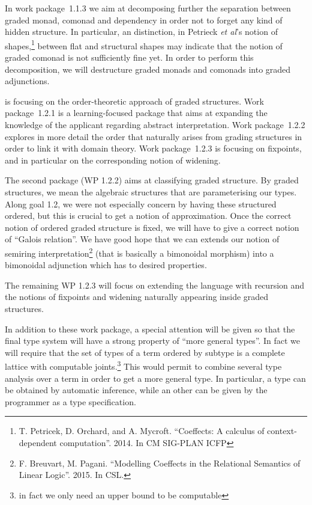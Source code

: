 \documentclass{article}[11pt]
\begin{document}
In work package~1.1.3 we aim at decomposing further the separation between graded monad, comonad and dependency in order not to forget any kind of hidden structure. In particular, an distinction, in Petrieck {\em et al}'s notion of shapes,\footnote{T. Petricek, D. Orchard, and A. Mycroft. ``Coeffects: A calculus of context-dependent computation''. 2014. In CM SIG-PLAN ICFP} between flat and structural shapes may indicate that the notion of graded comonad is not sufficiently fine yet. In order to perform this decomposition, we will destructure graded monads and comonads into graded adjunctions.

 is focusing on the order-theoretic approach of graded structures. Work package~1.2.1 is a learning-focused package that aims at expanding the knowledge of the applicant regarding abstract interpretation. %
Work package~1.2.2 explores in more detail the order that naturally arises from grading structures in order to link it with domain theory. Work package~1.2.3 is focusing on fixpoints, and in particular on the corresponding notion of widening.


The second package (WP 1.2.2) aims at classifying graded structure. By graded structures, we mean the algebraic structures that are parameterising our types. Along goal 1.2, we were not especially concern by having these structured ordered, but this is crucial to get a notion of approximation. Once the correct notion of ordered graded structure is fixed, we will have to give a correct notion of ``Galois relation''. We have good hope that we can extends our notion of semiring interpretation\footnote{F. Breuvart, M. Pagani. ``Modelling Coeffects in the Relational Semantics of Linear Logic''. 2015. In CSL.} (that is basically a bimonoidal morphism) into a bimonoidal adjunction which has to desired properties.

The remaining WP 1.2.3 will focus on extending the language with recursion and the notions of fixpoints and widening naturally appearing inside graded structures.

In addition to these work package, a special attention will be given so that the final type system will have a strong property of ``more general types''. In fact we will require that the set of types of a term ordered by subtype is a complete lattice with computable joints.\footnote{in fact we only need an upper bound to be computable} This would permit to combine several type analysis over a term in order to get a more general type. In particular, a type can be obtained by automatic inference, while an other can be given by the programmer as a type specification.
\end{document}
